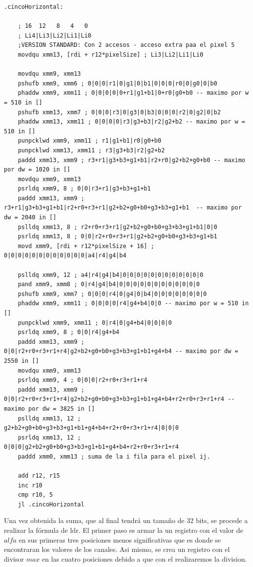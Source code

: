 \begin{codesnippet}
\begin{verbatim}
.cincoHorizontal:

	; 16  12   8   4   0
	; Li4|Li3|Li2|Li1|Li0
    ;VERSION STANDARD: Con 2 accesos - acceso extra paa el pixel 5
    movdqu xmm13, [rdi + r12*pixelSize] ; Li3|Li2|Li1|Li0

	movdqu xmm9, xmm13
	pshufb xmm9, xmm6 ; 0|0|0|r1|0|g1|0|b1|0|0|0|r0|0|g0|0|b0
	phaddw xmm9, xmm11 ; 0|0|0|0|0+r1|g1+b1|0+r0|g0+b0 -- maximo por w = 510 in []
	pshufb xmm13, xmm7 ; 0|0|0|r3|0|g3|0|b3|0|0|0|r2|0|g2|0|b2
    phaddw xmm13, xmm11 ; 0|0|0|0|r3|g3+b3|r2|g2+b2 -- maximo por w = 510 in []
    punpcklwd xmm9, xmm11 ; r1|g1+b1|r0|g0+b0
    punpcklwd xmm13, xmm11 ; r3|g3+b3|r2|g2+b2
    paddd xmm13, xmm9 ; r3+r1|g3+b3+g1+b1|r2+r0|g2+b2+g0+b0 -- maximo por dw = 1020 in []
    movdqu xmm9, xmm13
    psrldq xmm9, 8 ; 0|0|r3+r1|g3+b3+g1+b1
    paddd xmm13, xmm9 ; r3+r1|g3+b3+g1+b1|r2+r0+r3+r1|g2+b2+g0+b0+g3+b3+g1+b1  -- maximo por dw = 2040 in []
    pslldq xmm13, 8 ; r2+r0+r3+r1|g2+b2+g0+b0+g3+b3+g1+b1|0|0
    psrldq xmm13, 8 ; 0|0|r2+r0+r3+r1|g2+b2+g0+b0+g3+b3+g1+b1
	movd xmm9, [rdi + r12*pixelSize + 16] ; 0|0|0|0|0|0|0|0|0|0|0|0|a4|r4|g4|b4

	pslldq xmm9, 12 ; a4|r4|g4|b4|0|0|0|0|0|0|0|0|0|0|0|0
	pand xmm9, xmm8 ; 0|r4|g4|b4|0|0|0|0|0|0|0|0|0|0|0|0
	pshufb xmm9, xmm7 ; 0|0|0|r4|0|g4|0|b4|0|0|0|0|0|0|0|0
	phaddw xmm9, xmm11 ; 0|0|0|0|r4|g4+b4|0|0 -- maximo por w = 510 in []
	punpcklwd xmm9, xmm11 ; 0|r4|0|g4+b4|0|0|0|0
	psrldq xmm9, 8 ; 0|0|r4|g4+b4
	paddd xmm13, xmm9 ; 0|0|r2+r0+r3+r1+r4|g2+b2+g0+b0+g3+b3+g1+b1+g4+b4 -- maximo por dw = 2550 in []
	movdqu xmm9, xmm13
	psrldq xmm9, 4 ; 0|0|0|r2+r0+r3+r1+r4
	paddd xmm13, xmm9 ; 0|0|r2+r0+r3+r1+r4|g2+b2+g0+b0+g3+b3+g1+b1+g4+b4+r2+r0+r3+r1+r4 -- maximo por dw = 3825 in []
	pslldq xmm13, 12 ; g2+b2+g0+b0+g3+b3+g1+b1+g4+b4+r2+r0+r3+r1+r4|0|0|0
	psrldq xmm13, 12 ; 0|0|0|g2+b2+g0+b0+g3+b3+g1+b1+g4+b4+r2+r0+r3+r1+r4
	paddd xmm0, xmm13 ; suma de la i fila para el pixel ij.

	add r12, r15
	inc r10
	cmp r10, 5
	jl .cincoHorizontal
\end{verbatim}
\end{codesnippet}

Una vez obtenida la suma, que al final tendrá un tamaño de 32 bits, se procede a realizar la fórmula de ldr. 
El primer paso es armar la un registro con el valor de $alfa$ en sus primeras tres posiciones menos significativas que es donde se encontraran los valores de los canales. Asi mismo, se crea un registro con el divisor $max$ en las cuatro posiciones debido a que con el realizaremos la division.\\

